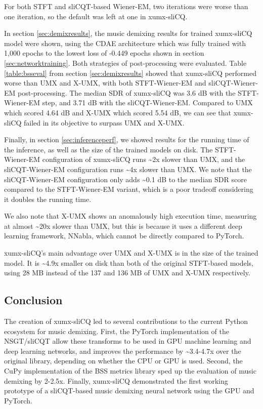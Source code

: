 \documentclass[report.tex]{subfiles}
\begin{document}
For both STFT and sliCQT-based Wiener-EM, two iterations were worse than one iteration, so the default was left at one in xumx-sliCQ.

In section \ref{sec:demixresults}, the music demixing results for trained xumx-sliCQ model were shown, using the CDAE architecture which was fully trained with 1,000 epochs to the lowest loss of -0.449 epochs shown in section \ref{sec:networktraining}. Both strategies of post-processing were evaluated. Table \ref{table:bsseval} from section \ref{sec:demixresults} showed that xumx-sliCQ performed worse than UMX and X-UMX, with both STFT-Wiener-EM and sliCQT-Wiener-EM post-processing. The median SDR of xumx-sliCQ was 3.6 dB with the STFT-Wiener-EM step, and 3.71 dB with the sliCQT-Wiener-EM. Compared to UMX which scored 4.64 dB and X-UMX which scored 5.54 dB, we can see that xumx-sliCQ failed in its objective to surpass UMX and X-UMX.

Finally, in section \ref{sec:inferenceperf}, we showed results for the running time of the inference, as well as the size of the trained models on disk. The STFT-Wiener-EM configuration of xumx-sliCQ runs \textasciitilde2x slower than UMX, and the sliCQT-Wiener-EM configuration runs \textasciitilde4x slower than UMX. We note that the sliCQT-Wiener-EM configuration only adds \textasciitilde0.1 dB to the median SDR score compared to the STFT-Wiener-EM variant, which is a poor tradeoff considering it doubles the running time.

We also note that X-UMX shows an anomalously high execution time, measuring at almost \textasciitilde20x slower than UMX, but this is because it uses a different deep learning framework, NNabla, which cannot be directly compared to PyTorch.

xumx-sliCQ's main advantage over UMX and X-UMX is in the size of the trained model. It is \textasciitilde4.9x smaller on disk than both of the original STFT-based models, using 28 MB instead of the 137 and 136 MB of UMX and X-UMX respectively.

\subsection{Conclusion}
\label{sec:conclusion}

The creation of xumx-sliCQ led to several contributions to the current Python ecosystem for music demixing. First, the PyTorch implementation of the NSGT/sliCQT allow these transforms to be used in GPU machine learning and deep learning networks, and improves the performance by \textasciitilde3.4-4.7x over the original library, depending on whether the CPU or GPU is used. Second, the CuPy implementation of the BSS metrics library sped up the evaluation of music demixing by 2-2.5x. Finally, xumx-sliCQ demonstrated the first working prototype of a sliCQT-based music demixing neural network using the GPU and PyTorch.
\end{document}
